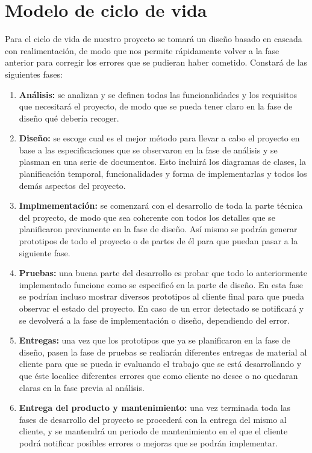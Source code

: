 \documentclass[palatino]{apuntes}
\begin{document}
\section{Modelo de ciclo de vida}

Para el ciclo de vida de nuestro proyecto se tomará un diseño basado en cascada con realimentación, de modo que nos permite rápidamente volver a la fase anterior para corregir los errores que se pudieran haber cometido. Constará de las siguientes fases:

\begin{enumerate}
	\item \textbf{Análisis:} se analizan y se definen todas las funcionalidades y los requisitos que necesitará el proyecto, de modo que se pueda tener claro en la fase de diseño qué debería recoger.
	\item \textbf{Diseño:} se escoge cual es el mejor método para llevar a cabo el proyecto en base a las especificaciones que se observaron en la fase de análisis y se plasman en una serie de documentos. Esto incluirá los diagramas de clases, la planificación temporal, funcionalidades y forma de implementarlas y todos los demás aspectos del proyecto.
	\item \textbf{Implmementación:} se comenzará con el desarrollo de toda la parte técnica del proyecto, de modo que sea coherente con todos los detalles que se planificaron previamente en la fase de diseño. Así mismo se podrán generar prototipos de todo el proyecto o de partes de él para que puedan pasar a la siguiente fase.
	\item \textbf{Pruebas:} una buena parte del desarrollo es probar que todo lo anteriormente implementado funcione como se especificó en la parte de diseño. En esta fase se podrían incluso mostrar diversos prototipos al cliente final para que pueda observar el estado del proyecto. En caso de un error detectado se notificará y se devolverá a la fase de implementación o diseño, dependiendo del error.
	\item \textbf{Entregas:} una vez que los prototipos que ya se planificaron en la fase de diseño, pasen la fase de pruebas se realiarán diferentes entregas de material al cliente para que se pueda ir evaluando el trabajo que se está desarrollando y que éste localice diferentes errores que como cliente no desee o no quedaran claras en la fase previa al análisis.
	\item \textbf{Entrega del producto y mantenimiento:} una vez terminada toda las fases de desarrollo del proyecto se procederá con la entrega del mismo al cliente, y se mantendrá un periodo de mantenimiento en el que el cliente podrá notificar posibles errores o mejoras que se podrán implementar.
\end{enumerate}
\end{document}

